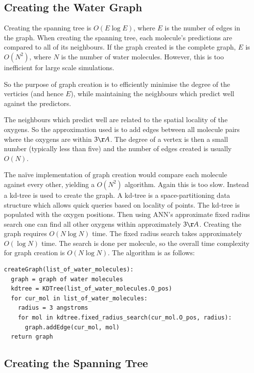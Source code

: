 \documentclass[a4paper]{report}
\begin{document}
\subsection{Creating the Water Graph}

Creating the spanning tree is $O(E \log E)$, where $E$ is the number of edges
in the graph. When creating the spanning tree, each molecule's predictions are
compared to all of its neighbours. If the graph created is the complete graph,
$E$ is $O(N^2)$, where $N$ is the number of water molecules. However, this is
too inefficient for large scale simulations.

So the purpose of graph creation is to efficiently minimise the degree of the
verticies (and hence $E$), while maintaining the neighbours which predict well
against the predictors.

The neighbours which predict well are related to the spatial locality of the
oxygens. So the approximation used is to add edges between all molecule pairs
where the oxygens are within $3\AA$. The degree of a vertex is then a small
number (typically less than five) and the number of edges created is usually
$O(N)$.

The na\"{i}ve implementation of graph creation would compare each molecule
against every other, yielding a $O(N^2)$ algorithm. Again this is too
slow. Instead a kd-tree \citep{cormen2001introduction} is used to create the
graph. A kd-tree is a space-partitioning data structure which allows quick
queries based on locality of points. The kd-tree is populated with the oxygen
positions. Then using ANN's approximate fixed radius search one can find all
other oxygens within approximately $3\AA$. Creating the graph requires $O(N
\log N)$ time. The fixed radius search takes approximately $O(\log N)$
time. The search is done per molecule, so the overall time complexity for
graph creation is $O(N \log N)$. The algorithm is as follows:

\begin{verbatim}
createGraph(list_of_water_molecules):
  graph = graph of water molecules
  kdtree = KDTree(list_of_water_molecules.O_pos)
  for cur_mol in list_of_water_molecules:
    radius = 3 angstroms
    for mol in kdtree.fixed_radius_search(cur_mol.O_pos, radius):
      graph.addEdge(cur_mol, mol)
  return graph
\end{verbatim}



\subsection{Creating the Spanning Tree}
\end{document}
